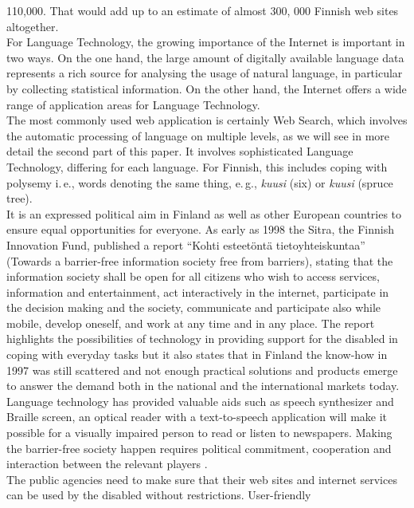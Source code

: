 \begin{multicols}{2}
110,000. That would add up to an estimate of almost 300, 000 Finnish
web sites altogether.\\
For Language Technology, the growing importance of the Internet is
important in two ways. On the one hand, the large amount of digitally
available language data represents a rich source for analysing the
usage of natural language, in particular by collecting statistical
information. On the other hand, the Internet offers a wide range of
application areas for Language Technology.\\
The most commonly used web application is certainly Web Search, which
involves the automatic processing of language on multiple levels, as
we will see in more detail the second part of this paper. It involves
sophisticated Language Technology, differing for each language. For
Finnish, this includes coping with polysemy
i.\,e., words denoting the same thing, e.\,g.,
\textit{\foreignlanguage{finnish}{\textit{kuusi}}} (six) or
\textit{\foreignlanguage{finnish}{\textit{kuusi}}} (spruce tree).\\
It is an expressed political aim in Finland as well as other European
countries to ensure equal opportunities for everyone. As early as 1998
the Sitra, the Finnish Innovation Fund, published a report “Kohti
esteetöntä tietoyhteiskuntaa” (Towards a barrier-free information
society free from barriers), stating that the information society
shall be open for all citizens who wish to access services, information
and entertainment, act interactively in the internet,
participate in the decision making and the society, communicate and
participate also while mobile, develop oneself, and work at any time
and in any place. The report highlights the possibilities of technology in
providing support for the disabled in coping with everyday tasks but
it also states that in Finland the know-how in 1997 was still
scattered and not enough practical solutions and products emerge to
answer the demand both in the national and the international
markets today. Language technology has provided valuable aids such as speech
synthesizer and Braille screen, an optical reader with a
text-to-speech application will make it possible for a visually
impaired person to read or listen to newspapers. Making the
barrier-free society happen requires political commitment, cooperation
and interaction between the relevant players \cite{Sitra1998}.\\
The public agencies need to make sure that their web sites and internet
services can be used by the disabled without restrictions. User-friendly

\end{multicols}
